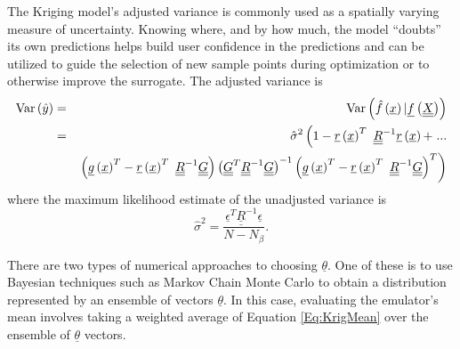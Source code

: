 The Kriging model's adjusted variance is commonly used as a spatially 
varying measure of uncertainty.  Knowing where, and by how much, the 
model ``doubts'' its own predictions helps build user confidence in 
the predictions and can be utilized to guide the selection of new 
sample points during optimization or to otherwise improve the 
surrogate.  The adjusted variance is
\begin{eqnarray*}
{\rm Var}\left(\hat{y}\right) &=& {\rm Var}\left(\hat{f}\left(\underline{x}\right)|\underline{f}\left(\underline{\underline{X}}\right)\right) \\ 
&=&\hat{\sigma}^2\left(1-\underline{r}\left(\underline{x}\right)^T\ \underline{\underline{R}}^{-1}\underline{r}\left(\underline{x}\right) + \right. ... \\
&&\left. \left(\underline{g}\left(\underline{x}\right)^T-\underline{r}\left(\underline{x}\right)^T\ \underline{\underline{R}}^{-1}\underline{\underline{G}}\right) \left(\underline{\underline{G}}^T\underline{\underline{R}}^{-1} \underline{\underline{G}}\right)^{-1}\left(\underline{g}\left(\underline{x}\right)^T-\underline{r}\left(\underline{x}\right)^T\ \underline{\underline{R}}^{-1}\underline{\underline{G}}\right)^T\right)
\end{eqnarray*}
where the maximum likelihood estimate of the unadjusted variance is
\begin{displaymath}
\hat{\sigma}^2=\frac{\underline{\epsilon}^T\underline{\underline{R}}^{-1}\underline{\epsilon}}{N-N_{\beta}}.
\end{displaymath}

There are two 
types of numerical approaches to choosing $\underline{\theta}$.  One of
these is to use Bayesian techniques such as Markov Chain Monte Carlo to
obtain a distribution represented by an ensemble of vectors 
$\underline{\theta}$.  In this case, evaluating the emulator's mean involves
taking a weighted average of Equation \ref{Eq:KrigMean} over the ensemble 
of $\underline{\theta}$ vectors.\newline

